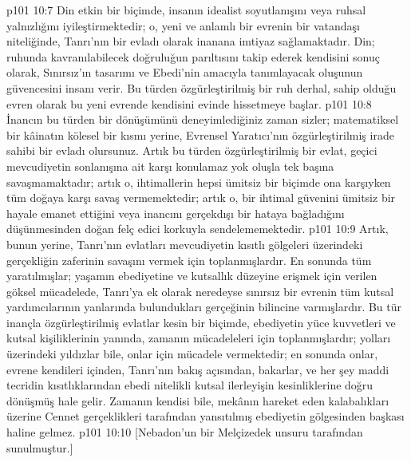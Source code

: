 \vs p101 10:7 Din etkin bir biçimde, insanın idealist soyutlanışını veya ruhsal yalnızlığını iyileştirmektedir; o, yeni ve anlamlı bir evrenin bir vatandaşı niteliğinde, Tanrı’nın bir evladı olarak inanana imtiyaz sağlamaktadır. Din; ruhunda kavranılabilecek doğruluğun parıltısını takip ederek kendisini sonuç olarak, Sınırsız’ın tasarımı ve Ebedi’nin amacıyla tanımlayacak oluşunun güvencesini insanı verir. Bu türden özgürleştirilmiş bir ruh derhal, sahip olduğu evren olarak bu yeni evrende kendisini evinde hissetmeye başlar.
\vs p101 10:8 İnancın bu türden bir dönüşümünü deneyimlediğiniz zaman sizler; matematiksel bir kâinatın kölesel bir kısmı yerine, Evrensel Yaratıcı’nın özgürleştirilmiş irade sahibi bir evladı olursunuz. Artık bu türden özgürleştirilmiş bir evlat, geçici mevcudiyetin sonlanışına ait karşı konulamaz yok oluşla tek başına savaşmamaktadır; artık o, ihtimallerin hepsi ümitsiz bir biçimde ona karşıyken tüm doğaya karşı savaş vermemektedir; artık o, bir ihtimal güvenini ümitsiz bir hayale emanet ettiğini veya inancını gerçekdışı bir hataya bağladığını düşünmesinden doğan felç edici korkuyla sendelememektedir.
\vs p101 10:9 Artık, bunun yerine, Tanrı’nın evlatları mevcudiyetin kısıtlı gölgeleri üzerindeki gerçekliğin zaferinin savaşını vermek için toplanmışlardır. En sonunda tüm yaratılmışlar; yaşamın ebediyetine ve kutsallık düzeyine erişmek için verilen göksel mücadelede, Tanrı’ya ek olarak neredeyse sınırsız bir evrenin tüm kutsal yardımcılarının yanlarında bulundukları gerçeğinin bilincine varmışlardır. Bu tür inançla özgürleştirilmiş evlatlar kesin bir biçimde, ebediyetin yüce kuvvetleri ve kutsal kişiliklerinin yanında, zamanın mücadeleleri için toplanmışlardır; yolları üzerindeki yıldızlar bile, onlar için mücadele vermektedir; en sonunda onlar, evrene kendileri içinden, Tanrı’nın bakış açısından, bakarlar, ve her şey maddi tecridin kısıtlıklarından ebedi nitelikli kutsal ilerleyişin kesinliklerine doğru dönüşmüş hale gelir. Zamanın kendisi bile, mekânın hareket eden kalabalıkları üzerine Cennet gerçeklikleri tarafından yansıtılmış ebediyetin gölgesinden başkası haline gelmez.
\vs p101 10:10 [Nebadon’un bir Melçizedek unsuru tarafından sunulmuştur.]
